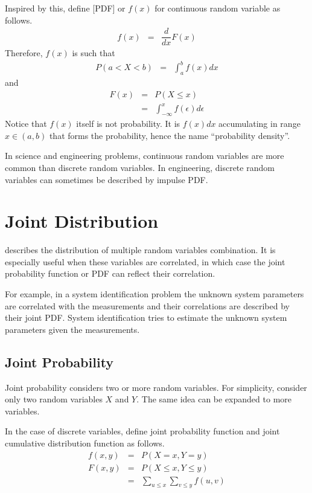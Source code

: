 Inspired by this, define [PDF] or $f(x)$ for continuous random variable as follows. 
\begin{eqnarray}
f(x) &=& \dfrac{d}{dx}F(x) \nonumber
\end{eqnarray}
Therefore, $f(x)$ is such that
\begin{eqnarray}
  P(a < X < b) &=& \int_{a}^{b}f(x)dx \nonumber
\end{eqnarray}
and
\begin{eqnarray}
  F(x) &=& P(X\leq x) \nonumber \\
  &=& \int_{-\infty}^{x} f(\epsilon)d\epsilon \nonumber
\end{eqnarray}
Notice that $f(x)$ itself is not probability. It is $f(x)dx$ accumulating in range $x \in (a, b)$ that forms the probability, hence the name ``probability density''.

In science and engineering problems, continuous random variables are more common than discrete random variables. In engineering, discrete random variables can sometimes be described by impulse PDF.

\section{Joint Distribution}

 describes the distribution of multiple random variables combination. It is especially useful when these variables are correlated, in which case the joint probability function or PDF can reflect their correlation. 

For example, in a system identification problem the unknown system parameters are correlated with the measurements and their correlations are described by their joint PDF. System identification tries to estimate the unknown system parameters given the measurements.

\subsection{Joint Probability}

Joint probability considers two or more random variables. For simplicity, consider only two random variables $X$ and $Y$. The same idea can be expanded to more variables.

In the case of discrete variables, define joint probability function and joint cumulative distribution function as follows.
\begin{eqnarray}
  f(x, y) &=& P\left(X=x, Y=y\right) \nonumber \\
  F(x, y) &=& P\left(X\leq x, Y\leq y\right) \nonumber \\
  &=& \sum_{u\leq x}\sum_{v\leq y}f(u, v) \nonumber
\end{eqnarray}

